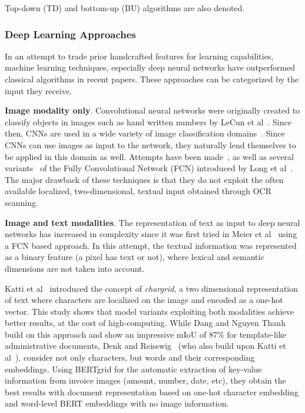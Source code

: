 \documentclass[oneside, english, bibtex]{kththesis}
\begin{document}
\begin{center}
Top-down (TD) and bottom-up (BU) algorithms are also denoted.
\end{center}

\subsubsection{Deep Learning Approaches}
\label{subs:dlapproaches}

In an attempt to trade prior handcrafted features for learning capabilities, machine learning techniques, especially deep neural networks have outperformed classical algorithms in recent papers. These approaches can be categorized by the input they receive.

\textbf{Image modality only}. Convolutional neural networks were originally created to classify objects in images such as hand written numbers by LeCun et al~\cite{lecun1989}. Since then, CNNs are used in a wide variety of image classification domains~\cite{deng2009}. Since CNNs can use images as input to the network, they naturally lend themselves to be applied in this domain as well. Attempts have been made~\cite{DBLP:journals/corr/0011S17}, as well as several variants~\cite{he2017, xu2017, wickpuppe2018, oliveira2018} of the Fully Convolutional Network (FCN) introduced by Long et al~\cite{DBLP:journals/corr/LongSD14}. The major drawback of these techniques is that they do not exploit the often available localized, two-dimensional, textual input obtained through OCR scanning.

\textbf{Image and text modalities}. The representation of text as input to deep neural networks has increased in complexity since it was first tried in Meier et al~\cite{8270006} using a FCN based approach. In this attempt, the textual information was represented as a binary feature (a pixel has text or not), where lexical and semantic dimensions are not taken into account.

Katti et al~\cite{katti2018} introduced the concept of \textit{chargrid}, a two dimensional representation of text where characters are localized on the image and encoded as a one-hot vector. This study shows that model variants exploiting both modalities achieve better results, at the cost of high-computing. While Dang and Nguyen Thanh~\cite{DBLP:journals/corr/abs-2106-00952} build on this approach and show an impressive mIoU of 87\% for template-like administrative documents, Denk and Reisswig~\cite{DBLP:journals/corr/abs-1909-04948} (who also build upon Katti et al~\cite{katti2018}), consider not only characters, but words and their corresponding embeddings. Using BERTgrid for the automatic extraction of key-value information from invoice images (amount, number, date, etc), they obtain the best results with document representation based on one-hot character embedding and word-level BERT embeddings with no image information.
\end{document}
